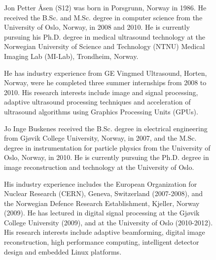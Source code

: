 \begin{figure}[!t]

  \begin{IEEEbiography}{Jon Petter \AA{}sen}
  (S12) was born in Porsgrunn, Norway in 1986. He received the B.Sc. and M.Sc. degree in computer science from the University of Oslo, Norway, in 2008 and 2010. He is currently pursuing his Ph.D. degree in medical ultrasound technology at the Norwegian University of Science and Technology (NTNU) Medical Imaging Lab (MI-Lab), Trondheim, Norway. 

  He has industry experience from GE Vingmed Ultrasound, Horten, Norway, were he completed three summer internships from 2008 to 2010. His research interests include image and signal processing, adaptive ultrasound processing techniques and acceleration of ultrasound algorithms using Graphics Processing Units (GPUs). 
  \end{IEEEbiography}

  \begin{IEEEbiography}{Jo Inge Buskenes}
  received the B.Sc. degree in electrical engineering from Gj\o{}vik College University, Norway, in 2007, and the M.Sc. degree in instrumentation for particle physics from the University of Oslo, Norway, in 2010. He is currently pursuing the Ph.D. degree in image reconstruction and technology at the University of Oslo.

  His industry experience includes the European Organization for Nuclear Research (CERN), Geneva, Switzerland (2007-2008), and the Norwegian Defence Research Establishment, Kjeller, Norway (2009). He has lectured in digital signal processing at the Gj\o{}vik College University (2009), and at the University of Oslo (2010-2012). His research interests include adaptive beamforming, digital image reconstruction, high performance computing, intelligent detector design and embedded Linux platforms.
  \end{IEEEbiography}


\end{figure}
